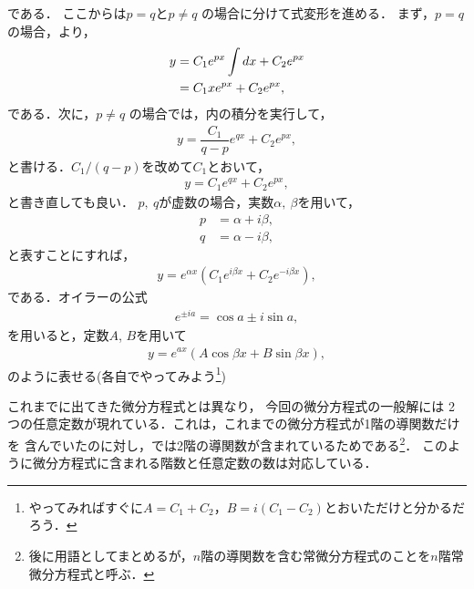 である．
ここからは$p = q$と$p\neq q$ の場合に分けて式変形を進める．
まず，$p=q$の場合，より，
\begin{align}
  y &= C_{1}e^{px}\int dx + C_{2}e^{px} \notag \\
    &= C_{1} x e^{px} + C_{2}e^{px}, \label{eq:solution_PDE_04_degenerate}
\end{align}
である．次に，$p \neq q$ の場合では，内の積分を実行して，
\begin{align}
 y = \dfrac{C_{1}}{q-p} e^{qx} + C_{2}e^{px},
\end{align}
と書ける．$C_1/\left(q -p \right)$を改めて$C_{1}$とおいて，
\begin{align}
 y = C_{1} e^{qx} + C_{2}e^{px}, 
\end{align}
と書き直しても良い．
$p,~q$が虚数の場合，実数$\alpha,~\beta$を用いて，
\begin{align}
  p &= \alpha + i \beta, \\
  q &= \alpha - i \beta, 
\end{align}
と表すことにすれば，
\begin{align}
  y = e^{\alpha x}\left(C_1 e^{i\beta x} + C_{2}e^{-i\beta x} \right) ,
\end{align}
である．オイラーの公式
\begin{align}
  e^{\pm i a} = \cos a \pm i\sin a, 
\end{align}
を用いると，定数$A$, $B$を用いて
\begin{align}
 y = e^{ax}\left(A\cos \beta x + B\sin \beta x\right), 
\end{align}
のように表せる(各自でやってみよう\footnote{やってみればすぐに$A=C_1+C_2$，$B=i(C_1-C_2)$とおいただけと分かるだろう．})

これまでに出てきた微分方程式とは異なり，
今回の微分方程式の一般解には
2つの任意定数が現れている．これは，これまでの微分方程式が1階の導関数だけを
含んでいたのに対し，では2階の導関数が含まれているためである\footnote{後に用語としてまとめるが，$n$階の導関数を含む常微分方程式のことを$n$階常微分方程式と呼ぶ．}．
このように微分方程式に含まれる階数と任意定数の数は対応している．

